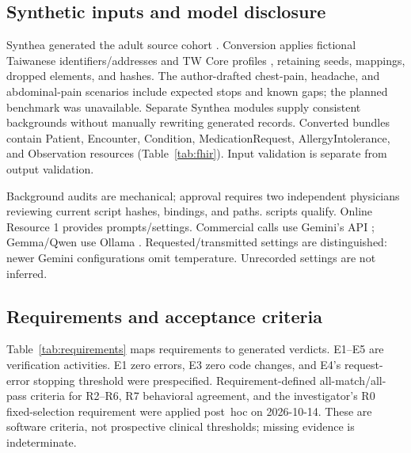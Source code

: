 \subsection{Synthetic inputs and model disclosure}
Synthea generated the adult source cohort \citep{syntheaMethod,syntheaSoftware}.
Conversion applies fictional Taiwanese identifiers/addresses and TW Core profiles
\citep{twcoreIG}, retaining seeds, mappings, dropped elements, and hashes. The
\ScenarioCount{} author-drafted chest-pain, headache, and abdominal-pain scenarios
include expected stops and known gaps; the planned benchmark was unavailable.
Separate Synthea modules supply consistent backgrounds without manually rewriting
generated records. Converted bundles contain Patient, Encounter, Condition,
MedicationRequest, AllergyIntolerance, and Observation resources
(Table~\ref{tab:fhir}). Input validation is separate from output validation.

Background audits are mechanical; approval requires two independent physicians
reviewing current script hashes, bindings, and paths. \ValidatedScriptCount{}
scripts qualify. Online Resource 1 provides prompts/settings. Commercial calls
use Gemini's API \citep{googleGeminiAPI}; Gemma/Qwen use Ollama
\citep{ollamaSoftware,gemmaThree,qwenTwoFive}. Requested/transmitted settings are
distinguished: newer Gemini configurations omit temperature. Unrecorded settings
are not inferred.

\subsection{Requirements and acceptance criteria}
Table~\ref{tab:requirements} maps requirements to generated verdicts. E1--E5 are
verification activities. E1 zero errors, E3 zero code changes, and E4's request-error
stopping threshold were prespecified. Requirement-defined all-match/all-pass
criteria for R2--R6, R7 behavioral agreement, and the investigator's R0 fixed-selection
requirement were applied post~hoc on 2026-10-14. These are software criteria,
not prospective clinical thresholds; missing evidence is indeterminate.

\begin{table}[t]\centering\footnotesize
\caption{Requirements, criterion sources, and generated verdicts. R7 is reported separately
for each replacement in Table~\ref{tab:e3}.}\label{tab:requirements}
\setlength{\tabcolsep}{3pt}

\end{table}


